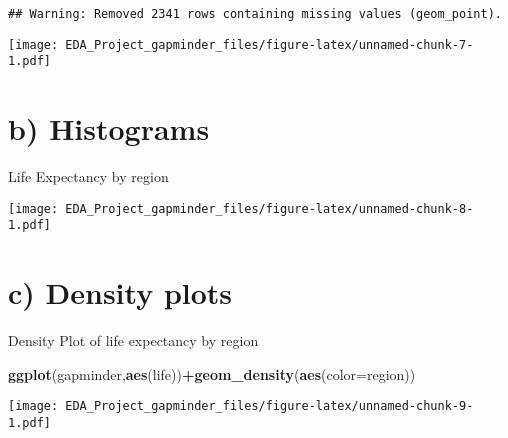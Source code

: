 \documentclass[]{article}
\newenvironment{Shaded}{\begin{snugshade}}{\end{snugshade}}
\newcommand{\KeywordTok}[1]{\textcolor[rgb]{0.13,0.29,0.53}{\textbf{#1}}}
\newcommand{\DataTypeTok}[1]{\textcolor[rgb]{0.13,0.29,0.53}{#1}}
\newcommand{\DecValTok}[1]{\textcolor[rgb]{0.00,0.00,0.81}{#1}}
\newcommand{\OperatorTok}[1]{\textcolor[rgb]{0.81,0.36,0.00}{\textbf{#1}}}
\newcommand{\NormalTok}[1]{#1}
\begin{document}
\begin{verbatim}
## Warning: Removed 2341 rows containing missing values (geom_point).
\end{verbatim}

\texttt{[image: EDA\_Project\_gapminder\_files/figure-latex/unnamed-chunk-7-1.pdf]}

\section{b) Histograms}\label{b-histograms}

Life Expectancy by region

\begin{Shaded}
\end{Shaded}

\texttt{[image: EDA\_Project\_gapminder\_files/figure-latex/unnamed-chunk-8-1.pdf]}

\section{c) Density plots}\label{c-density-plots}

Density Plot of life expectancy by region

\begin{Shaded}
\begin{Highlighting}[]
\KeywordTok{ggplot}\NormalTok{(gapminder,}\KeywordTok{aes}\NormalTok{(life))}\OperatorTok{+}\KeywordTok{geom_density}\NormalTok{(}\KeywordTok{aes}\NormalTok{(}\DataTypeTok{color=}\NormalTok{region))}
\end{Highlighting}
\end{Shaded}

\texttt{[image: EDA\_Project\_gapminder\_files/figure-latex/unnamed-chunk-9-1.pdf]}
\end{document}
